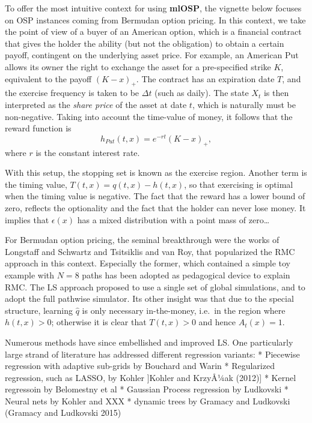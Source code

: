 \documentclass[]{article}
\begin{document}
To offer the most intuitive context for using \textbf{mlOSP}, the
vignette below focuses on OSP instances coming from Bermudan option
pricing. In this context, we take the point of view of a buyer of an
American option, which is a financial contract that gives the holder the
ability (but not the obligation) to obtain a certain payoff, contingent
on the underlying asset price. For example, an American Put allows its
owner the right to exchange the asset for a pre-specified strike \(K\),
equivalent to the payoff \((K-x)_+\). The contract has an expiration
date \(T\), and the exercise frequency is taken to be \(\Delta t\) (such
as daily). The state \(X_t\) is then interpreted as the
\emph{share price} of the asset at date \(t\), which is naturally must
be non-negative. Taking into account the time-value of money, it follows
that the reward function is \[
  h_{Put}(t,x) = e^{-r t} (K-x)_+,
\] where \(r\) is the constant interest rate.

With this setup, the stopping set is known as the exercise region.
Another term is the timing value, \(T(t,x) = q(t,x) - h(t,x)\), so that
exercising is optimal when the timing value is negative. The fact that
the reward has a lower bound of zero, reflects the optionality and the
fact that the holder can never lose money. It implies that
\(\epsilon(x)\) has a mixed distribution with a point mass of
zero\ldots{}

For Bermudan option pricing, the seminal breakthrough were the works of
Longstaff and Schwartz and Tsitsiklis and van Roy, that popularized the
RMC approach in this context. Especially the former, which contained a
simple toy example with \(N=8\) paths has been adopted as pedagogical
device to explain RMC. The LS approach proposed to use a single set of
global simulations, and to adopt the full pathwise simulator. Its other
insight was that due to the special structure, learning \(\hat{q}\) is
only necessary in-the-money, i.e.~in the region where \(h(t,x) >0\);
otherwise it is clear that \(T(t,x) > 0\) and hence \(A_t(x) = 1\).

Numerous methods have since embellished and improved LS. One
particularly large strand of literature has addressed different
regression variants: * Piecewise regression with adaptive sub-grids by
Bouchard and Warin * Regularized regression, such as LASSO, by Kohler
{]}Kohler and KrzyÅ¼ak (2012){]} * Kernel regressoin by Belomestny et al
* Gaussian Process regression by Ludkovski * Neural nets by Kohler and
XXX * dynamic trees by Gramacy and Ludkovski (Gramacy and Ludkovski
2015)
\end{document}
